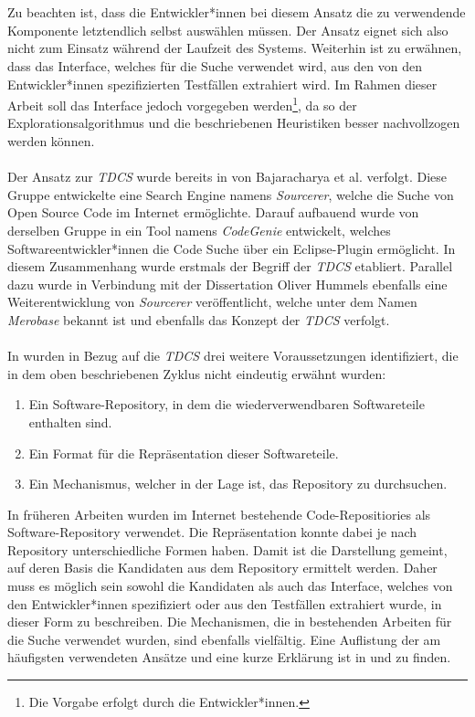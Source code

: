 \\\\
Zu beachten ist, dass die Entwickler*innen bei diesem Ansatz die zu verwendende Komponente letztendlich selbst auswählen müssen. Der Ansatz eignet sich also nicht zum Einsatz während der Laufzeit des Systems. Weiterhin ist zu erwähnen, dass das \Gls{Interface}, welches für die Suche verwendet wird, aus den von den Entwickler*innen spezifizierten Testfällen extrahiert wird. Im Rahmen dieser Arbeit soll das \Gls{Interface} jedoch vorgegeben werden\footnote{Die Vorgabe erfolgt durch die Entwickler*innen.}, da so der Explorationsalgorithmus und die beschriebenen Heuristiken besser nachvollzogen werden können.
\\\\
Der Ansatz zur \emph{TDCS} wurde bereits in \cite{sourcerer} von Bajaracharya et al.  verfolgt. Diese Gruppe entwickelte eine Search \Gls{Engine} namens \emph{Sourcerer}, welche die Suche von Open Source Code im Internet ermöglichte. Darauf aufbauend wurde von derselben Gruppe in \cite{Lemos} ein Tool namens \emph{CodeGenie} entwickelt, welches Softwareentwickler*innen die Code Suche über ein Eclipse-Plugin ermöglicht. In diesem Zusammenhang wurde erstmals der Begriff der \emph{TDCS} etabliert. Parallel dazu wurde in Verbindung mit der Dissertation Oliver Hummels \cite{hummel08} ebenfalls eine Weiterentwicklung von \emph{Sourcerer} veröffentlicht, welche unter dem Namen \emph{Merobase} bekannt ist und ebenfalls das Konzept der \emph{TDCS} verfolgt.
\\\\
In \cite{hummel08} wurden in Bezug auf die \emph{TDCS} drei weitere Voraussetzungen identifiziert, die in dem oben beschriebenen Zyklus nicht eindeutig erwähnt wurden:
\begin{enumerate}
\item Ein Software-Repository, in dem die wiederverwendbaren Softwareteile enthalten sind.
\item Ein Format für die Repräsentation dieser Softwareteile.
\item Ein Mechanismus, welcher in der Lage ist, das Repository zu durchsuchen.
\end{enumerate}
\noindent
In früheren Arbeiten wurden im Internet bestehende Code-Repositiories als Software-Repository verwendet. Die Repräsentation konnte dabei je nach Repository unterschiedliche Formen haben. Damit ist die Darstellung gemeint, auf deren Basis die Kandidaten aus dem Repository ermittelt werden. Daher muss es möglich sein sowohl die Kandidaten als auch das \Gls{Interface}, welches von den Entwickler*innen spezifiziert oder aus den Testfällen extrahiert wurde, in dieser Form zu beschreiben. Die Mechanismen, die in bestehenden Arbeiten für die Suche verwendet wurden, sind ebenfalls vielfältig. Eine Auflistung der am häufigsten verwendeten Ansätze und eine kurze Erklärung ist in \cite{Hummel2013} und \cite{hummel08} zu finden.
